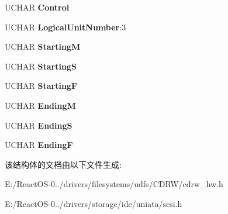 \begin{DoxyCompactItemize}
U\+C\+H\+AR {\bfseries Control}
\item 
\mbox{\label{struct___c_d_b_1_1___p_l_a_y___a_u_d_i_o___m_s_f_a9a0e82460d9856d720209cf9ef9bcbed}} 
U\+C\+H\+AR {\bfseries Logical\+Unit\+Number}\+:3
\item 
\mbox{\label{struct___c_d_b_1_1___p_l_a_y___a_u_d_i_o___m_s_f_ad9e90fbeefc5b13d5202639cad963cdc}} 
U\+C\+H\+AR {\bfseries StartingM}
\item 
\mbox{\label{struct___c_d_b_1_1___p_l_a_y___a_u_d_i_o___m_s_f_a267d84c999ab6f847c07ea30219e3a55}} 
U\+C\+H\+AR {\bfseries StartingS}
\item 
\mbox{\label{struct___c_d_b_1_1___p_l_a_y___a_u_d_i_o___m_s_f_acc5ebb8787b827ddc724669ed0a0832c}} 
U\+C\+H\+AR {\bfseries StartingF}
\item 
\mbox{\label{struct___c_d_b_1_1___p_l_a_y___a_u_d_i_o___m_s_f_abf90cf94168c4b3130b6d29d1e6155e8}} 
U\+C\+H\+AR {\bfseries EndingM}
\item 
\mbox{\label{struct___c_d_b_1_1___p_l_a_y___a_u_d_i_o___m_s_f_aff5585c0b98c4e904c482d1267a784cf}} 
U\+C\+H\+AR {\bfseries EndingS}
\item 
\mbox{\label{struct___c_d_b_1_1___p_l_a_y___a_u_d_i_o___m_s_f_af8c3848397daaf1c79c9611242162c26}} 
U\+C\+H\+AR {\bfseries EndingF}
\end{DoxyCompactItemize}


该结构体的文档由以下文件生成\+:\begin{DoxyCompactItemize}
\item 
E\+:/\+React\+O\+S-\/0../drivers/filesystems/udfs/\+C\+D\+R\+W/cdrw\+\_\+hw.\+h\item 
E\+:/\+React\+O\+S-\/0../drivers/storage/ide/uniata/scsi.\+h\end{DoxyCompactItemize}
